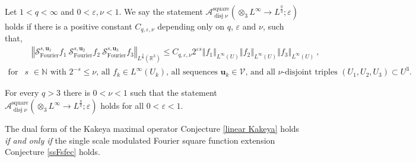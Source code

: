 \documentclass[10pt,a4paper]{amsart}
\begin{document}
\begin{definition}
Let $1<q<\infty$ and $0<\varepsilon,\nu<1$. We say the statement
$\mathcal{A}_{\operatorname*{disj}\nu}^{\operatorname*{square}}\left(
\otimes_{3}L^{\infty}\rightarrow L^{\frac{q}{3}};\varepsilon\right)  $ holds
if there is a positive constant $C_{q,\varepsilon,\nu}$ depending only on $q$,
$\varepsilon$ and $\nu$, such that,%
\begin{align}
&  \left\Vert \mathcal{S}_{\operatorname*{Fourier}}^{s,\mathbf{u}_{1}}%
f_{1}\ \mathcal{S}_{\operatorname*{Fourier}}^{s,\mathbf{u}_{2}}f_{2}%
\ \mathcal{S}_{\operatorname*{Fourier}}^{s,\mathbf{u}_{3}}f_{3}\right\Vert
_{L^{\frac{q}{3}}\left(  \mathbb{R}^{3}\right)  }\leq C_{q,\varepsilon,\nu
}2^{\varepsilon s}\left\Vert f_{1}\right\Vert _{L^{\infty}\left(  U\right)
}\left\Vert f_{2}\right\Vert _{L^{\infty}\left(  U\right)  }\left\Vert
f_{3}\right\Vert _{L^{\infty}\left(  U\right)  }\ ,\label{single tri Four}\\
\text{for all }s  &  \in\mathbb{N}\text{ with }2^{-s}\leq\nu\text{, all }%
f_{k}\in L^{\infty}\left(  U_{k}\right)  \text{, all sequences }\mathbf{u}%
_{k}\in\mathcal{V}\text{, and all }\nu\text{-disjoint triples }\left(
U_{1},U_{2},U_{3}\right)  \subset U^{3}.\nonumber
\end{align}

\end{definition}

\begin{conjecture}
\label{ssFsftec}For every $q>3$ there is $0<\nu<1$ such that the
statement $\mathcal{A}_{\operatorname*{disj}\nu}^{\operatorname*{square}%
}\left(  \otimes_{3}L^{\infty}\rightarrow L^{\frac{q}{3}};\varepsilon\right)
$ holds for all $0<\varepsilon<1$.
\end{conjecture}

\begin{proposition}
\label{Kak equiv}The dual form of the Kakeya maximal operator Conjecture
\ref{linear Kakeya} holds \emph{if and only if} the single scale modulated
Fourier square function extension Conjecture \ref{ssFsfec} holds.
\end{proposition}
\end{document}
